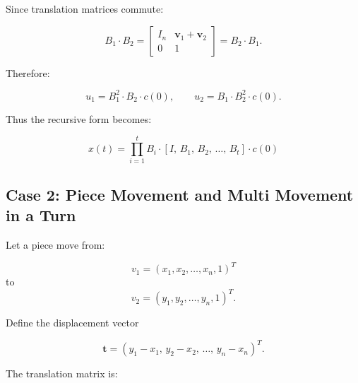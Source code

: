 \documentclass[11pt,a4paper]{article}
\theoremstyle{plain}
\theoremstyle{definition}
\begin{document}
Since translation matrices commute:

\vspace{0.5em}

\[
B_1 \cdot B_2 =
\begin{bmatrix}
I_n & \mathbf{v}_1 + \mathbf{v}_2 \\
0 & 1
\end{bmatrix}
=
B_2 \cdot B_1.
\]

\vspace{0.5em}

Therefore:

\vspace{0.5em}

\[
u_1 = B_1^2 \cdot B_2 \cdot c(0),
\qquad
u_2 = B_1 \cdot B_2^2 \cdot c(0).
\]

\vspace{0.5em}

Thus the recursive form becomes:

\vspace{0.5em}

\[
x(t) =\prod_{i=1}^t B_i \cdot [I,\, B_1,\, B_2,\,\ldots,\, B_t] \cdot c(0)
\]


\vspace{0.5em}


\subsection{Case 2: Piece Movement and Multi Movement in a Turn}
\label{app:case2-derivation}

\vspace{0.5em}

Let a piece move from:

\vspace{0.5em}

\[
v_1 = (x_1, x_2, \ldots, x_n, 1)^T
\]
to
\[
v_2 = (y_1, y_2, \ldots, y_n, 1)^T.
\]

\vspace{0.5em}

Define the displacement vector

\vspace{0.5em}

\[
\mathbf{t} = (y_1-x_1,\, y_2-x_2,\, \ldots,\, y_n-x_n)^T.
\]

\vspace{0.5em}

The translation matrix is:
\end{document}
